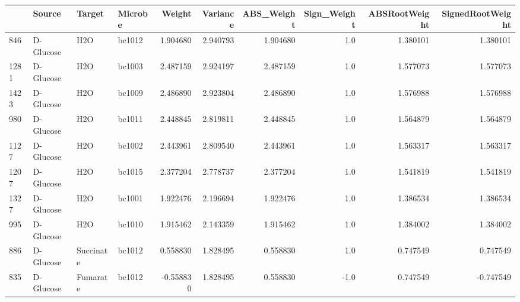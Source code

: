 \begin{tabular}{llllrrrrrr}
\toprule
{} &     Source &     Target & Microbe &    Weight &  Variance &  ABS\_Weight &  Sign\_Weight &  ABSRootWeight &  SignedRootWeight \\
\midrule
846  &  D-Glucose &        H2O &  bc1012 &  1.904680 &  2.940793 &    1.904680 &          1.0 &       1.380101 &          1.380101 \\
1281 &  D-Glucose &        H2O &  bc1003 &  2.487159 &  2.924197 &    2.487159 &          1.0 &       1.577073 &          1.577073 \\
1423 &  D-Glucose &        H2O &  bc1009 &  2.486890 &  2.923804 &    2.486890 &          1.0 &       1.576988 &          1.576988 \\
980  &  D-Glucose &        H2O &  bc1011 &  2.448845 &  2.819811 &    2.448845 &          1.0 &       1.564879 &          1.564879 \\
1127 &  D-Glucose &        H2O &  bc1002 &  2.443961 &  2.809540 &    2.443961 &          1.0 &       1.563317 &          1.563317 \\
1207 &  D-Glucose &        H2O &  bc1015 &  2.377204 &  2.778737 &    2.377204 &          1.0 &       1.541819 &          1.541819 \\
1327 &  D-Glucose &        H2O &  bc1001 &  1.922476 &  2.196694 &    1.922476 &          1.0 &       1.386534 &          1.386534 \\
995  &  D-Glucose &        H2O &  bc1010 &  1.915462 &  2.143359 &    1.915462 &          1.0 &       1.384002 &          1.384002 \\
886  &  D-Glucose &  Succinate &  bc1012 &  0.558830 &  1.828495 &    0.558830 &          1.0 &       0.747549 &          0.747549 \\
835  &  D-Glucose &   Fumarate &  bc1012 & -0.558830 &  1.828495 &    0.558830 &         -1.0 &       0.747549 &         -0.747549 \\
\bottomrule
\end{tabular}
